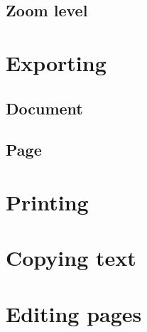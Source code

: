 \documentclass[10pt,a4paper]{article}
\begin{document}
\subsection{Zoom level}



\section{Exporting}



\subsection{Document}

\subsection{Page}

\section{Printing}


\section{Copying text}

\section{Editing pages}
\end{document}
